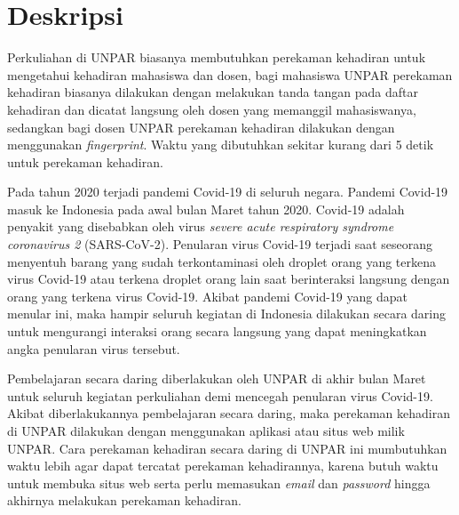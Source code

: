 \documentclass[a4paper,twoside]{article}
\begin{document}
\title{\@judultopik}
\author{\nama \textendash \@npm} 

\newcommand{\nama}{Reinalta Sugianto}
\newcommand{\@npm}{2017730035}
\newcommand{\@judultopik}{Perekaman Kehadiran Daring Otomatis} %
\newcommand{\jumpemb}{1} %
\newcommand{\tanggal}{04/10/2021}


\maketitle


\section{Deskripsi}
Perkuliahan di UNPAR biasanya membutuhkan perekaman kehadiran untuk mengetahui kehadiran mahasiswa dan dosen, bagi mahasiswa UNPAR perekaman kehadiran biasanya dilakukan dengan melakukan tanda tangan pada daftar kehadiran dan dicatat langsung oleh dosen yang memanggil mahasiswanya, sedangkan bagi dosen UNPAR perekaman kehadiran dilakukan dengan menggunakan  \textit{fingerprint}. Waktu yang dibutuhkan sekitar kurang dari 5 detik untuk perekaman kehadiran.

Pada tahun 2020 terjadi pandemi Covid-19 di seluruh negara. Pandemi Covid-19 masuk ke Indonesia pada awal bulan Maret tahun 2020. Covid-19 adalah penyakit yang disebabkan oleh virus \textit{severe acute respiratory syndrome coronavirus 2} (SARS-CoV-2). Penularan virus Covid-19 terjadi saat seseorang menyentuh barang yang sudah terkontaminasi oleh droplet orang yang terkena virus Covid-19 atau terkena droplet orang lain saat berinteraksi langsung dengan orang yang terkena virus Covid-19.  Akibat pandemi Covid-19 yang dapat menular ini, maka hampir seluruh kegiatan di Indonesia dilakukan secara daring untuk mengurangi interaksi orang secara langsung yang dapat meningkatkan angka penularan virus tersebut. 

Pembelajaran secara daring diberlakukan oleh UNPAR di akhir bulan Maret untuk seluruh kegiatan perkuliahan demi mencegah penularan virus Covid-19. Akibat diberlakukannya pembelajaran secara daring, maka perekaman kehadiran di UNPAR dilakukan dengan menggunakan aplikasi atau situs web milik UNPAR. Cara perekaman kehadiran secara daring di UNPAR ini mumbutuhkan waktu lebih agar dapat tercatat perekaman kehadirannya, karena butuh waktu untuk membuka situs web serta perlu memasukan \textit{email} dan \textit{password} hingga akhirnya melakukan perekaman kehadiran. 
\end{document}
